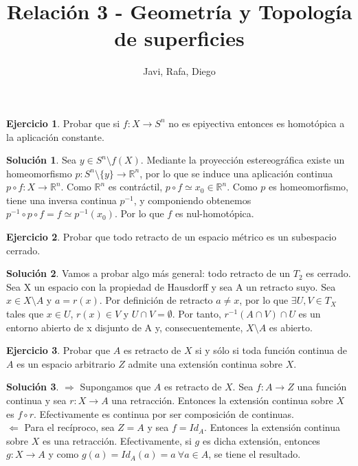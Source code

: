 \documentclass{article}
\theoremstyle{plain}
\theoremstyle{definition}
\newtheorem{exercise}{Ejercicio}
\newtheorem*{sol*}{Solución}
\newcommand{\R}{\mathbb{R}}
\begin{document}
\title{Relación 3 - Geometría y Topología de superficies }
\author{Javi, Rafa, Diego}
\maketitle
\begin{exercise}
Probar que si $f:X\to S^n$ no es epiyectiva entonces es homotópica a la aplicación constante.
\end{exercise}
\begin{sol*}
Sea $y\in S^n\setminus f(X)$. Mediante la proyección estereográfica existe un homeomorfismo $p:S^n\setminus\{y\}\to\R^n$, por lo que se induce una aplicación continua $p\circ f:X\to\R^n$. Como $\R^n$ es contráctil, $p\circ f\simeq x_0\in\R^n$. Como $p$ es homeomorfismo, tiene una inversa continua $p^{-1}$, y componiendo obtenemos $p^{-1}\circ p\circ f= f\simeq p^{-1}(x_0)$. Por lo que $f$ es nul-homotópica. 
\end{sol*}
\newpage
\begin{exercise}
Probar que todo retracto de un espacio métrico es un subespacio cerrado.
\end{exercise}
\begin{sol*}
Vamos a probar algo más general: todo retracto de un $T_2$ es cerrado. Sea X un espacio con la propiedad de Hausdorff y sea A un retracto suyo. Sea $x \in X\setminus A$ y $a=r(x)$. Por definición de retracto $a\neq x$, por lo que $\exists U,V\in T_X$ tales que $x\in U$, $r(x)\in V$ y $U\cap V = \emptyset$. Por tanto, $r^{-1}(A\cap V)\cap U$ es un entorno abierto de x disjunto de A y, consecuentemente, $X\setminus A$ es abierto.
\end{sol*}
\newpage
\begin{exercise}
Probar que $A$ es retracto de $X$ si y sólo si toda función continua de $A$ es un espacio arbitrario $Z$ admite una extensión continua sobre $X$.
\end{exercise}
\begin{sol*}
$\boxed{\Rightarrow}$ Supongamos que $A$ es retracto de $X$. Sea $f:A\to Z$ una función continua y sea $r:X\to A$ una retracción. Entonces la extensión continua sobre $X$ es $f\circ r$. Efectivamente es continua por ser composición de continuas.\\
$\boxed{\Leftarrow}$ Para el recíproco, sea $Z=A$ y sea $f=Id_A$. Entonces la extensión continua sobre $X$ es una retracción. Efectivamente, si $g$ es dicha extensión, entonces $g:X\to A$ y como $g(a)=Id_A(a)=a\ \forall a\in A$, se tiene el resultado. 
\end{sol*}
\end{document}
